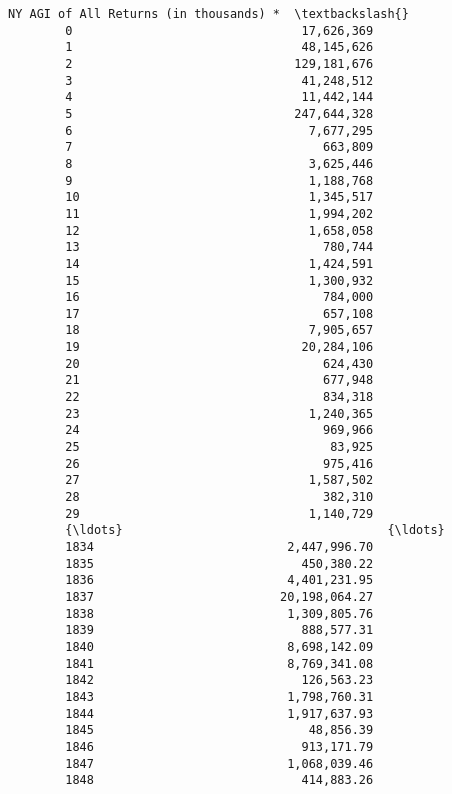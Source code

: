 \documentclass[11pt]{article}
\begin{document}
\begin{Verbatim}[commandchars=\\\{\}]
             NY AGI of All Returns (in thousands) *  \textbackslash{}
        0                                17,626,369   
        1                                48,145,626   
        2                               129,181,676   
        3                                41,248,512   
        4                                11,442,144   
        5                               247,644,328   
        6                                 7,677,295   
        7                                   663,809   
        8                                 3,625,446   
        9                                 1,188,768   
        10                                1,345,517   
        11                                1,994,202   
        12                                1,658,058   
        13                                  780,744   
        14                                1,424,591   
        15                                1,300,932   
        16                                  784,000   
        17                                  657,108   
        18                                7,905,657   
        19                               20,284,106   
        20                                  624,430   
        21                                  677,948   
        22                                  834,318   
        23                                1,240,365   
        24                                  969,966   
        25                                   83,925   
        26                                  975,416   
        27                                1,587,502   
        28                                  382,310   
        29                                1,140,729   
        {\ldots}                                     {\ldots}   
        1834                           2,447,996.70   
        1835                             450,380.22   
        1836                           4,401,231.95   
        1837                          20,198,064.27   
        1838                           1,309,805.76   
        1839                             888,577.31   
        1840                           8,698,142.09   
        1841                           8,769,341.08   
        1842                             126,563.23   
        1843                           1,798,760.31   
        1844                           1,917,637.93   
        1845                              48,856.39   
        1846                             913,171.79   
        1847                           1,068,039.46   
        1848                             414,883.26   

\end{Verbatim}
\end{document}
